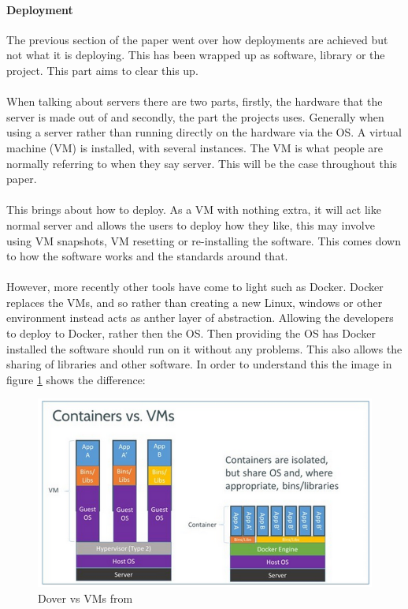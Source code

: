 \paragraph{Deployment}

The previous section of the paper went over how deployments are achieved but not what it is deploying. This has been wrapped up as software, library or the project. This part aims to clear this up.
\\\\
When talking about servers there are two parts, firstly, the hardware that the server is made out of and secondly, the part the projects uses. Generally when using a server rather than running directly on the hardware via the OS. A virtual machine (VM) is installed, with several instances. The VM is what people are normally referring to when they say server. This will be the case throughout this paper.
\\\\
This brings about how to deploy. As a VM with nothing extra, it will act like normal server and allows the users to deploy how they like, this may involve using VM snapshots, VM resetting or re-installing the software. This comes down to how the software works and the standards around that. 
\\\\
However, more recently other tools have come to light such as Docker. Docker replaces the VMs, and so rather than creating a new Linux, windows or other environment instead acts as anther layer of abstraction. Allowing the developers to deploy to Docker, rather then the OS. Then providing the OS has Docker installed the software should run on it without any problems. This also allows the sharing of libraries and other software. In order to understand this the image in figure \ref{fig:docker-vm} shows the difference:

\begin{figure}[H]
	\centering
	\includegraphics[scale=0.45]{images/docker-vm.png}
	\caption{Dover vs VMs from \cite{docker-vm}}
	\label{fig:docker-vm}
\end{figure}

